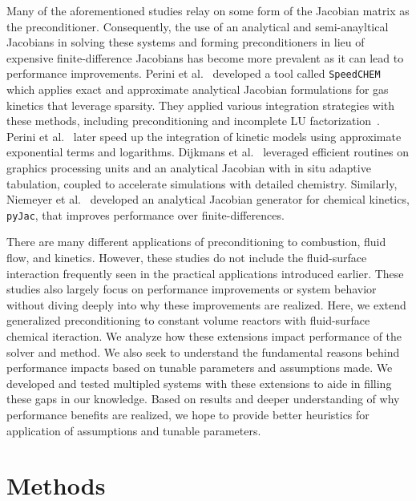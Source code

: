 \documentclass{article}
\newcommand{\sectionOne}[1]{\section{#1} \addvspace{10pt}}
\begin{document}
Many of the aforementioned studies relay on some form of the Jacobian matrix as the preconditioner.
Consequently, the use of an analytical and semi-anayltical Jacobians in solving these systems and forming preconditioners in lieu of expensive finite-difference Jacobians has become more prevalent as it can lead to performance improvements.
Perini et al.~\cite{perini_analytical_2012} developed a tool called \texttt{SpeedCHEM} which applies exact and approximate analytical Jacobian formulations for gas kinetics that leverage sparsity.
They applied various integration strategies with these methods, including preconditioning and incomplete LU factorization~\cite{perini_study_2014}.
Perini et al.~\cite{perini_fast_2018} later speed up the integration of kinetic models using approximate exponential terms and logarithms.
Dijkmans et al.~\cite{dijkmans_gpu_2014} leveraged efficient routines on graphics processing units and an analytical Jacobian with in situ adaptive tabulation, coupled to accelerate simulations with detailed chemistry.
Similarly, Niemeyer et al.~\cite{niemeyer_pyjac_2017} developed an analytical Jacobian generator for chemical kinetics, \texttt{pyJac}, that improves performance over finite-differences.

There are many different applications of preconditioning to combustion, fluid flow, and kinetics.
However, these studies do not include the fluid-surface interaction frequently seen in the practical applications introduced earlier.
These studies also largely focus on performance improvements or system behavior without diving deeply into why these improvements are realized.
Here, we extend generalized preconditioning to constant volume reactors with fluid-surface chemical iteraction.
We analyze how these extensions impact performance of the solver and method.
We also seek to understand the fundamental reasons behind performance impacts based on tunable parameters and assumptions made.
We developed and tested multipled systems with these extensions to aide in filling these gaps in our knowledge.
Based on results and deeper understanding of why performance benefits are realized, we hope to provide better heuristics for application of assumptions and tunable parameters.

\sectionOne{Methods}
\label{p1:methods-section}
\end{document}
